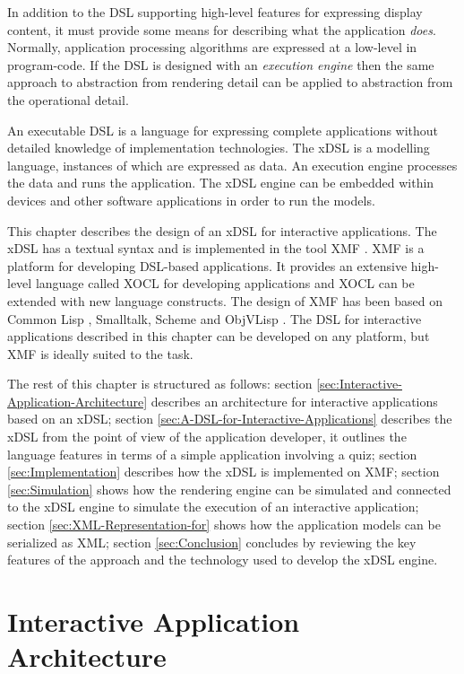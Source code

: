 In addition to the DSL supporting high-level features for expressing
display content, it must provide some means for describing what the
application \emph{does}. Normally, application processing algorithms
are expressed at a low-level in program-code. If the DSL is designed
with an \emph{execution engine} then the same approach to abstraction
from rendering detail can be applied to abstraction from the operational
detail.

An executable DSL is a language for expressing complete applications
without detailed knowledge of implementation technologies. The xDSL
is a modelling language, instances of which are expressed as data.
An execution engine processes the data and runs the application. The
xDSL engine can be embedded within devices and other software applications
in order to run the models.

This chapter describes the design of an xDSL for interactive applications.
The xDSL has a textual syntax and is implemented in the tool XMF \cite{XMF}.
XMF is a platform for developing DSL-based applications. It provides
an extensive high-level language called XOCL for developing applications
and XOCL can be extended with new language constructs. The design
of XMF has been based on Common Lisp \cite{Lisp}, Smalltalk, Scheme
\cite{Scheme} and ObjVLisp \cite{objVlisp}. The DSL for interactive
applications described in this chapter can be developed on any platform,
but XMF is ideally suited to the task.

The rest of this chapter is structured as follows: section \ref{sec:Interactive-Application-Architecture}
describes an architecture for interactive applications based on an
xDSL; section \ref{sec:A-DSL-for-Interactive-Applications} describes
the xDSL from the point of view of the application developer, it outlines
the language features in terms of a simple application involving a
quiz; section \ref{sec:Implementation} describes how the xDSL is
implemented on XMF; section \ref{sec:Simulation} shows how the rendering
engine can be simulated and connected to the xDSL engine to simulate
the execution of an interactive application; section \ref{sec:XML-Representation-for}
shows how the application models can be serialized as XML; section
\ref{sec:Conclusion} concludes by reviewing the key features of the
approach and the technology used to develop the xDSL engine.


\section{Interactive Application Architecture\label{sec:Interactive-Application-Architecture}}

